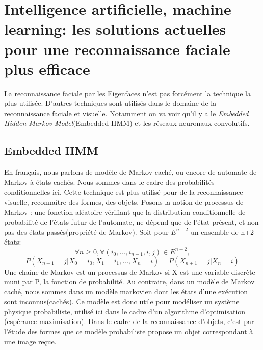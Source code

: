 \documentclass[12pt,french]{article}
\theoremstyle{plain}
\theoremstyle{definition}
\begin{document}
\section{Intelligence artificielle, machine learning: les solutions actuelles pour une reconnaissance faciale plus efficace}
La reconnaissance faciale par les Eigenfaces n'est pas forcément la technique la plus utilisée. D'autres techniques sont utilisés dans le domaine de la reconnaissance faciale et visuelle. Notamment on va voir qu'il y a le \textit{ Embedded Hidden Markov Model}(Embedded HMM) et les réseaux neuronaux convolutifs.
\subsection{Embedded HMM}
En français, nous parlons de modèle de Markov caché, ou encore de automate de Markov à états cachés. Nous sommes dans le cadre des probabilités conditionnelles ici. Cette technique est plus utilisé pour de la reconnaissance visuelle, reconnaître des formes, des objets.
Posons la notion de processus de Markov : une fonction aléatoire vérifiant que la distribution conditionnelle de probabilité de l'états futur de l'automate, ne dépend que de l'état présent, et non pas des états passés(propriété de Markov). Soit pour $E^{n+2}$ un ensemble de n+2 états:
\[
  \forall n\geq0, \forall(i_0,..., i_{n-1}, i, j)\in E^{n+2},
\]
\[
  P(X_{n+1}=j | X_0=i_0, X_1=i_1, ..., X_n=i) = P(X_{n+1}=j | X_n=i)
\]
Une chaîne de Markov est un processus de Markov si X est une variable discrète muni par P, la fonction de probabilité.
Au contraire, dans un modèle de Markov caché, nous sommes dans un modèle markovien dont les états d'une exécution sont inconnus(cachés).
Ce modèle est donc utile pour modéliser un système physique probabiliste, utilisé ici dans le cadre d'un algorithme d'optimisation (espérance-maximisation).
Dans le cadre de la reconnaissance d'objets, c'est par l'étude des formes que ce modèle probabiliste propose un objet correspondant à une image reçue.
\end{document}
